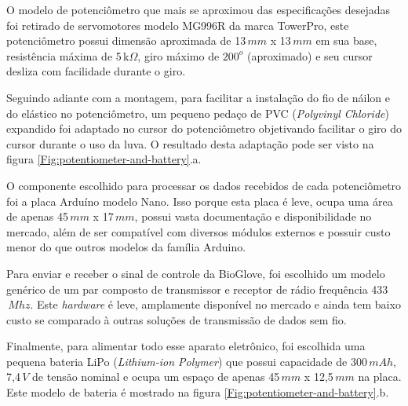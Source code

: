 \documentclass[
	12pt,				%
	openright,			%
	oneside,			%
	a4paper,			%
	english,			%
	brazil				%
	]{abntex2}
\begin{document}
			O modelo de potenciômetro que mais se aproximou das especificações desejadas foi retirado de servomotores modelo MG996R da marca TowerPro, este potenciômetro possui dimensão aproximada de 13$\,mm$ x 13$\,mm$ em sua base, resistência máxima de 5$\,$k$\Omega$, giro máximo de $200^{o}$ (aproximado) e seu cursor desliza com facilidade durante o giro. 

			Seguindo adiante com a montagem, para facilitar a instalação do fio de náilon e do elástico no potenciômetro, um pequeno pedaço de PVC (\textit{Polyvinyl Chloride}) expandido foi adaptado no cursor do potenciômetro objetivando facilitar o giro do cursor durante o uso da luva. O resultado desta adaptação pode ser visto na figura \ref{Fig:potentiometer-and-battery}.a.

			O componente escolhido para processar os dados recebidos de cada potenciômetro foi a placa Arduíno modelo Nano. Isso porque esta placa é leve, ocupa uma área de apenas 45$\,mm$ x 17$\,mm$, possui vasta documentação e disponibilidade no mercado, além de ser compatível com diversos módulos externos e possuir custo menor do que outros modelos da família Arduino.

			Para enviar e receber o sinal de controle da BioGlove, foi escolhido um modelo genérico de um par composto de transmissor e receptor de rádio frequência 433$\,Mhz$. Este \textit{hardware} é leve, amplamente disponível no mercado e ainda tem baixo custo se comparado à outras soluções de transmissão de dados sem fio.

			Finalmente, para alimentar todo esse aparato eletrônico, foi escolhida uma pequena bateria LiPo (\textit{Lithium-ion Polymer}) que possui capacidade de 300$\,mAh$, 7,4$\,V$ de tensão nominal e ocupa um espaço de apenas 45$\,mm$ x 12,5$\,mm$ na placa. Este modelo de bateria é mostrado na figura \ref{Fig:potentiometer-and-battery}.b.
\end{document}
